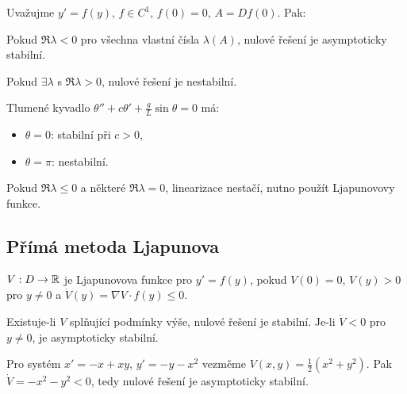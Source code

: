 \begin{theorem}
\label{vet:ljapunov-linearizace}
Uvažujme $y'=f(y)$, $f\in C^1$, $f(0)=0$, $A=Df(0)$. Pak:
\begin{romanenum}
\item Pokud $\Re\lambda<0$ pro všechna vlastní čísla $\lambda(A)$, nulové řešení je asymptoticky stabilní.
\item Pokud $\exists\lambda$ s $\Re\lambda>0$, nulové řešení je nestabilní.
\end{romanenum}
\end{theorem}

\begin{example}
\label{ex:stabilita-kyvadla}
Tlumené kyvadlo $\theta''+c\theta'+\tfrac{g}{L}\sin\theta=0$ má:
\begin{itemize}
\item $\theta=0$: stabilní při $c>0$,
\item $\theta=\pi$: nestabilní.
\end{itemize}
\end{example}

\begin{remark}
\label{rem:kriticky-pripad}
Pokud $\Re\lambda\le 0$ a některé $\Re\lambda=0$, linearizace nestačí, nutno použít Ljapunovovy funkce.
\end{remark}

\spc

\subsection{Přímá metoda Ljapunova}
\label{sec:prima-ljapunov}

\begin{definition}
\label{def:ljapunovova-funkce}
$V:D\to\mathbb{R}$ je Ljapunovova funkce pro $y'=f(y)$, pokud $V(0)=0$, $V(y)>0$ pro $y\neq 0$ a $\dot V(y)=\nabla V\cdot f(y)\le 0$.
\end{definition}

\begin{theorem}
\label{vet:ljapunov-stabilita}
Existuje-li $V$ splňující podmínky výše, nulové řešení je stabilní. Je-li $\dot V<0$ pro $y\neq0$, je asymptoticky stabilní.
\end{theorem}

\begin{example}
\label{ex:ljapunov-example}
Pro systém $x'=-x+xy$, $y'=-y-x^2$ vezměme $V(x,y)=\tfrac12(x^2+y^2)$. Pak $\dot V=-x^2-y^2<0$, tedy nulové řešení je asymptoticky stabilní.
\end{example}


